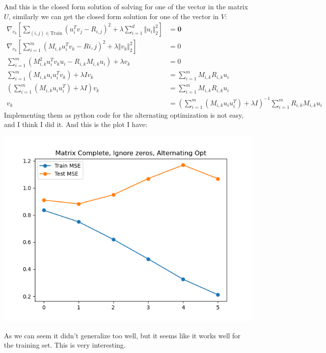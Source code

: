 \documentclass[]{article}
\begin{document}
        And this is the closed form solution of solving for one of the vector in the matrix $U$, similarly we can get the closed form solution for one of the vector in $V$:
        \begin{align*}\tag{B1.c.3}\label{eqn:B1.c.3}
            \nabla_{v_k} \left[
                \sum_{(i, j)\in \text{Train}}^{}
                    (u_i^Tv_j - R_{i, j})^2
                +
                \lambda \sum_{i = 1}^{d}
                    \Vert u_i\Vert_2^2
            \right] &= \mathbf{0}
            \\
            \nabla_{v_k} \left[
                \sum_{i = 1}^{m}(M_{i, k}u_i^Tv_k - R{i, j})^2 + \lambda \Vert v_k\Vert_2^2
            \right] &= 0
            \\
            \sum_{i = 1}^{m}
                (M_{i, k}^2u_i^Tv_ku_i - R_{i, k}M_{i, k}u_i) + \lambda v_k 
            &= 0
            \\
            \sum_{i = 1}^{m}(M_{i,k}u_iu_i^Tv_k) + \lambda I v_k
            &= \sum_{i = 1}^{m} M_{i, k}R_{i,k}u_i
            \\
            \left(
                \sum_{i = 1}^{m}(M_{i,k}u_iu_i^T) + \lambda I
            \right)v_k &= \sum_{i = 1}^{m} M_{i, k}R_{i,k}u_i
            \\
            v_k &= \left(
                \sum_{i = 1}^{m}(M_{i, k}u_iu_i^T) + \lambda I
            \right)^{-1}
            \sum_{i = 1}^{m} R_{i, k}M_{i, k}u_i
        \end{align*}
        Implementing them as python code for the alternating optimization is not easy, and I think I did it. And this is the plot I have: 
        \begin{center}
            \includegraphics*[]{22-42-27-b1-c.png}
        \end{center}
        As we can seem it didn't generalize too well, but it seems like it works well for the training set. This is very interesting. 
\end{document}
